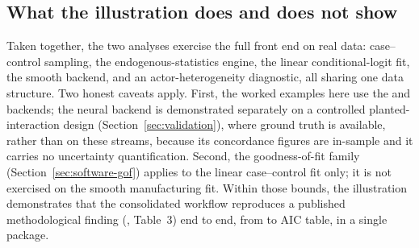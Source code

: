 \subsection{What the illustration does and does not show}
\label{sec:illustration-scope}

Taken together, the two analyses exercise the full front end on real data:
case--control sampling, the endogenous-statistics engine, the linear
conditional-logit fit, the smooth backend, and an actor-heterogeneity
diagnostic, all sharing one data structure. Two honest caveats apply. First,
the worked examples here use the  and  backends; the
neural  backend is demonstrated separately on a controlled planted-%
interaction design (Section~\ref{sec:validation}), where ground truth is
available, rather than on these streams, because its concordance figures are
in-sample and it carries no uncertainty quantification. Second, the
goodness-of-fit family (Section~\ref{sec:software-gof}) applies to the linear
case--control fit only; it is not exercised on the smooth manufacturing fit.
Within those bounds, the illustration demonstrates that the consolidated
workflow reproduces a published methodological finding
(\citealp{juozaitiene2024}, Table~3) end to end, from  to AIC
table, in a single package.
